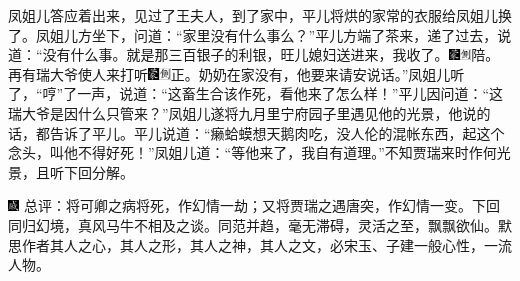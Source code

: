 凤姐儿答应着出来，见过了王夫人，到了家中，平儿将烘的家常的衣服给凤姐儿换了。凤姐儿方坐下，问道：``家里没有什么事么？''平儿方端了茶来，递了过去，说道：``没有什么事。就是那三百银子的利银，旺儿媳妇送进来，我收了。{\includegraphics[width=3mm]{../Images/00006}\includegraphics[width=3mm]{../Images/00011}\footnotesize \kaishu 陪。}再有瑞大爷使人来打听{\includegraphics[width=3mm]{../Images/00006}\includegraphics[width=3mm]{../Images/00011}\footnotesize \kaishu 正。}奶奶在家没有，他要来请安说话。''凤姐儿听了，``哼''了一声，说道：``这畜生合该作死，看他来了怎么样！''平儿因问道：``这瑞大爷是因什么只管来？''凤姐儿遂将九月里宁府园子里遇见他的光景，他说的话，都告诉了平儿。平儿说道：``癞蛤蟆想天鹅肉吃，没人伦的混帐东西，起这个念头，叫他不得好死！''凤姐儿道：``等他来了，我自有道理。''不知贾瑞来时作何光景，且听下回分解。

{\includegraphics[width=3mm]{../Images/00005}  \kaishu  总评：将可卿之病将死，作幻情一劫；又将贾瑞之遇唐突，作幻情一变。下回同归幻境，真风马牛不相及之谈。同范并趋，毫无滞碍，灵活之至，飘飘欲仙。默思作者其人之心，其人之形，其人之神，其人之文，必宋玉、子建一般心性，一流人物。}

